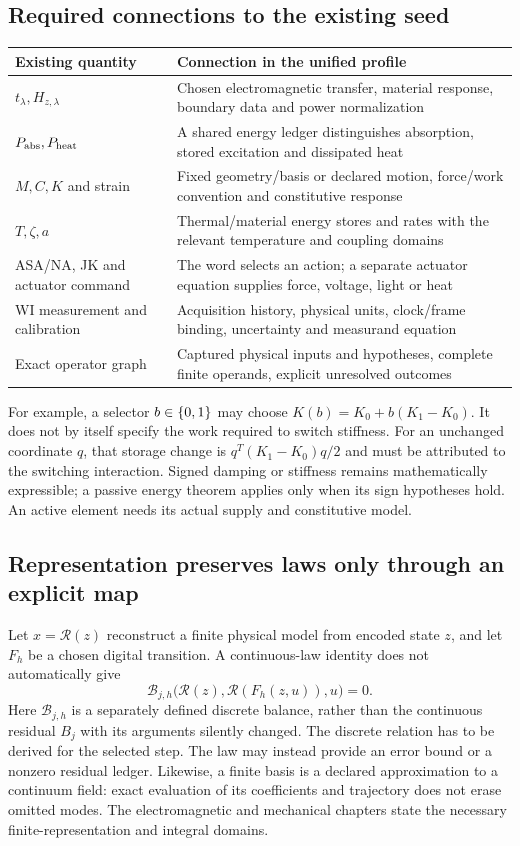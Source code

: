 \subsection{Required connections to the existing seed}
\begin{center}\small
\begin{tabularx}{\linewidth}{@{}P{36mm}Y@{}}
\toprule Existing quantity & Connection in the unified profile\\\midrule
$t_\lambda,H_{z,\lambda}$ & Chosen electromagnetic transfer, material response, boundary data and power normalization\\
$P_{\rm abs},P_{\rm heat}$ & A shared energy ledger distinguishes absorption, stored excitation and dissipated heat\\
$M,C,K$ and strain & Fixed geometry/basis or declared motion, force/work convention and constitutive response\\
$T,\zeta,a$ & Thermal/material energy stores and rates with the relevant temperature and coupling domains\\
ASA/NA, JK and actuator command & The word selects an action; a separate actuator equation supplies force, voltage, light or heat\\
WI measurement and calibration & Acquisition history, physical units, clock/frame binding, uncertainty and measurand equation\\
Exact operator graph & Captured physical inputs and hypotheses, complete finite operands, explicit unresolved outcomes\\
\bottomrule
\end{tabularx}\end{center}
For example, a selector $b\in\{0,1\}$ may choose
$K(b)=K_0+b(K_1-K_0)$. It does not by itself specify the work required to
switch stiffness. For an unchanged coordinate $q$, that storage change is
$q^T(K_1-K_0)q/2$ and must be attributed to the switching interaction.
Signed damping or stiffness remains mathematically expressible; a passive
energy theorem applies only when its sign hypotheses hold. An active element
needs its actual supply and constitutive model.

\subsection{Representation preserves laws only through an explicit map}
Let $x=\mathcal R(z)$ reconstruct a finite physical model from encoded state
$z$, and let $F_h$ be a chosen digital transition. A continuous-law identity
does not automatically give
\begin{equation}
 \mathcal B_{j,h}\bigl(\mathcal R(z),\mathcal R(F_h(z,u)),u\bigr)=0.
\end{equation}
Here $\mathcal B_{j,h}$ is a separately defined discrete balance, rather than
the continuous residual $B_j$ with its arguments silently changed. The
discrete relation has to be derived for the selected step.
The law may instead provide an error bound or a nonzero residual ledger.
Likewise, a finite basis is a declared approximation to a continuum field:
exact evaluation of its coefficients and trajectory does not erase omitted
modes. The electromagnetic and mechanical chapters state the necessary
finite-representation and integral domains.

